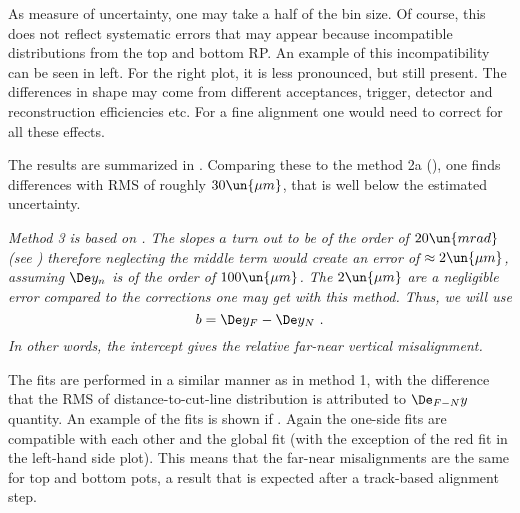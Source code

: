As measure of uncertainty, one may take a half of the bin size. Of course, this does not reflect systematic errors that may appear because incompatible distributions from the top and bottom RP. An example of this incompatibility can be seen in  left. For the right plot, it is less pronounced, but still present. The differences in shape may come from different acceptances, trigger, detector and reconstruction efficiencies etc. For a fine alignment one would need to correct for all these effects.

The results are summarized in . Comparing these to the method 2a (), one finds differences with RMS of roughly $30\un{\mu m}$, that is well below the estimated uncertainty.




\em{Method 3} is based on . The slopes $a$ turn out to be of the order of $20\un{mrad}$ (see ) therefore neglecting the middle term would create an error of $\approx 2\un{\mu m}$, assuming $\De y_n$ is of the order of $100\un{\mu m}$. The $2\un{\mu m}$ are a negligible error compared to the corrections one may get with this method. Thus, we will use
$$b = \De y_F - \De y_N\ .$$
In other words, the intercept gives the relative far-near vertical misalignment.

The fits are performed in a similar manner as in method 1, with the difference that the RMS of distance-to-cut-line distribution is attributed to $\De_{F-N} y$ quantity. An example of the fits is shown if . Again the one-side fits are compatible with each other and the global fit (with the exception of the red fit in the left-hand side plot). This means that the far-near misalignments are the same for top and bottom pots, a result that is expected after a track-based alignment step.

